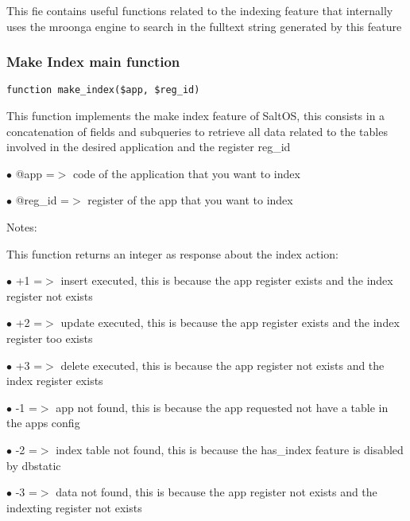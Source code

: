 \documentclass[a4paper]{article}
\begin{document}
This fie contains useful functions related to the indexing feature that internally uses the
mroonga engine to search in the fulltext string generated by this feature

\hypertarget{toc482}{}
\subsubsection{Make Index main function}

\begin{lstlisting}
function make_index($app, $reg_id)
\end{lstlisting}

This function implements the make index feature of SaltOS, this consists
in a concatenation of fields and subqueries to retrieve all data related to
the tables involved in the desired application and the register reg\_id

\begin{compactitem}
\item[\color{myblue}$\bullet$] @app    =$>$ code of the application that you want to index
\item[\color{myblue}$\bullet$] @reg\_id =$>$ register of the app that you want to index
\end{compactitem}

Notes:

This function returns an integer as response about the index action:

\begin{compactitem}
\item[\color{myblue}$\bullet$] +1 =$>$ insert executed, this is because the app register exists and the index register not exists
\item[\color{myblue}$\bullet$] +2 =$>$ update executed, this is because the app register exists and the index register too exists
\item[\color{myblue}$\bullet$] +3 =$>$ delete executed, this is because the app register not exists and the index register exists
\item[\color{myblue}$\bullet$] -1 =$>$ app not found, this is because the app requested not have a table in the apps config
\item[\color{myblue}$\bullet$] -2 =$>$ index table not found, this is because the has\_index feature is disabled by dbstatic
\item[\color{myblue}$\bullet$] -3 =$>$ data not found, this is because the app register not exists and the indexting register not exists
\end{compactitem}
\end{document}
